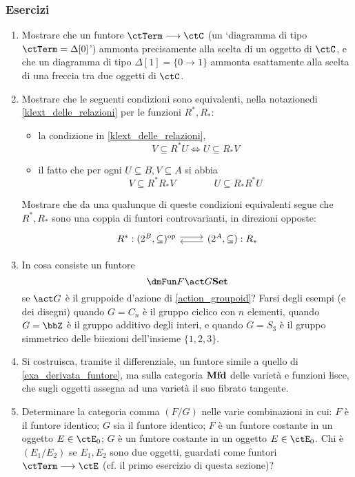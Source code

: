 \subsubsection*{Esercizi}
\begin{enumerate}
	\item Mostrare che un funtore $\ctTerm \fun\ctC$ (un `diagramma di tipo $\ctTerm = \Delta[0]$') ammonta precisamente alla scelta di un oggetto di $\ctC$, e che un diagramma di tipo $\Delta[1] = \{0\to 1\}$ ammonta esattamente alla scelta di una freccia tra due oggetti di $\ctC$.
	\item Mostrare che le seguenti condizioni sono equivalenti, nella notazionedi \ref{klext_delle_relazioni} per le funzioni \(R^*,R_*\):
	      \begin{itemize}
		      \item la condizione in \ref{klext_delle_relazioni},
		            \[V\subseteq R^*U\iff U\subseteq R_*V\]
		      \item il fatto che per ogni \(U\subseteq B,V\subseteq A\) si abbia
		            \[V\subseteq R^*R_*V\qquad\qquad U\subseteq R_*R^*U\]
	      \end{itemize}
	      Mostrare che da una qualunque di queste condizioni equivalenti segue che \(R^*,R_*\) sono una coppia di funtori controvarianti, in direzioni opposte:
	      \[\begin{tikzcd}
			      R^* : (2^B,\subseteq)^\op \ar[r, shift left] & (2^A,\subseteq) : R_* \ar[l, shift left]
		      \end{tikzcd}\]
	\item In cosa consiste un funtore 
	\[\dmFun F {\act G}\ctSet\]
	se $\act G$ è il gruppoide d'azione di \ref{action_groupoid}? Farsi degli esempi (e dei disegni) quando $G=C_n$ è il gruppo ciclico con $n$ elementi, quando $G=\bbZ$ è il gruppo additivo degli interi, e quando $G=S_3$ è il gruppo simmetrico delle biiezioni dell'insieme $\{1,2,3\}$.
	\item Si costruisca, tramite il differenziale, un funtore simile a quello di \ref{exa_derivata_funtore}, ma sulla categoria \(\mathbf{Mfd}\) delle varietà e funzioni lisce, che sugli oggetti assegna ad una varietà il suo fibrato tangente.
	\item Determinare la categoria comma $(F/G)$ nelle varie combinazioni in cui: $F$ è il funtore identico; $G$ sia il funtore identico; $F$ è un funtore costante in un oggetto $E\in\ctE_0$; $G$ è un funtore costante in un oggetto $E\in\ctE_0$. Chi è $(E_1/E_2)$ se $E_1,E_2$ sono due oggetti, guardati come funtori $\ctTerm \fun\ctE$ (cf. il primo esercizio di questa sezione)?
\end{enumerate}

